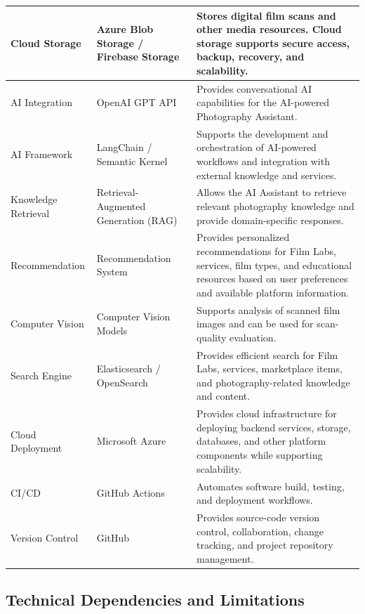 \begin{table}[htbp]
\begin{tabular}{|p{2.8cm}|p{3.5cm}|p{6.2cm}|}
Cloud Storage &
Azure Blob Storage / Firebase Storage &
Stores digital film scans and other media resources. Cloud storage
supports secure access, backup, recovery, and scalability. \\
\hline

AI Integration &
OpenAI GPT API &
Provides conversational AI capabilities for the AI-powered
Photography Assistant. \\
\hline

AI Framework &
LangChain / Semantic Kernel &
Supports the development and orchestration of AI-powered workflows
and integration with external knowledge and services. \\
\hline

Knowledge Retrieval &
Retrieval-Augmented Generation (RAG) &
Allows the AI Assistant to retrieve relevant photography knowledge
and provide domain-specific responses. \\
\hline

Recommendation &
Recommendation System &
Provides personalized recommendations for Film Labs, services,
film types, and educational resources based on user preferences
and available platform information. \\
\hline

Computer Vision &
Computer Vision Models &
Supports analysis of scanned film images and can be used for
scan-quality evaluation. \\
\hline

Search Engine &
Elasticsearch / OpenSearch &
Provides efficient search for Film Labs, services, marketplace
items, and photography-related knowledge and content. \\
\hline

Cloud Deployment &
Microsoft Azure &
Provides cloud infrastructure for deploying backend services,
storage, databases, and other platform components while supporting
scalability. \\
\hline

CI/CD &
GitHub Actions &
Automates software build, testing, and deployment workflows. \\
\hline

Version Control &
GitHub &
Provides source-code version control, collaboration, change
tracking, and project repository management. \\
\hline

\end{tabular}
\end{table}

\subsection*{Technical Dependencies and Limitations}

